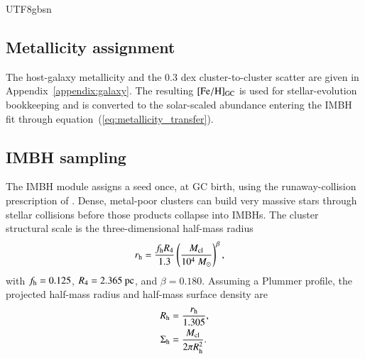 \documentclass[trackchanges, twocolappendix, twocolumn]{aastex701}
\begin{document}
\begin{CJK*}{UTF8}{gbsn}
\subsection{Metallicity assignment}
\label{subsubsect:metallicity_assignment}

The host-galaxy metallicity and the $0.3$ dex cluster-to-cluster scatter are given in Appendix~\ref{appendix:galaxy}. The resulting $[\mathrm{Fe}/\mathrm{H}]_{\rm GC}$ is used for stellar-evolution bookkeeping and is converted to the solar-scaled abundance entering the IMBH fit through equation~(\ref{eq:metallicity_transfer}).

\subsection{IMBH sampling}
\label{append:IMBH}
\label{subsect:IMBH}
\label{subsubsect:runaway_imbh}

The IMBH module assigns a seed once, at GC birth, using the runaway-collision prescription of \cite{Rantala+2026FROST&IMBH}. Dense, metal-poor clusters can build very massive stars through stellar collisions before those products collapse into IMBHs. The cluster structural scale is the three-dimensional half-mass radius
\begin{align}
r_{\rm h} & =
\dfrac{f_{\rm h}R_4}{1.3}
\left(\dfrac{M_{\rm cl}}{10^4~M_\odot}\right)^\beta,
\label{eq:imbh_radius}
\end{align}
with $f_{\rm h}=0.125$, $R_4=2.365~{\rm pc}$, and $\beta=0.180$. Assuming a Plummer profile, the projected half-mass radius and half-mass surface density are
\begin{align}
R_{\rm h} & = \dfrac{r_{\rm h}}{1.305},\\
\Sigma_{\rm h} & = \dfrac{M_{\rm cl}}{2\pi R_{\rm h}^2}.
\label{eq:imbh_sigma}
\end{align}


\end{CJK*}
\end{document}
